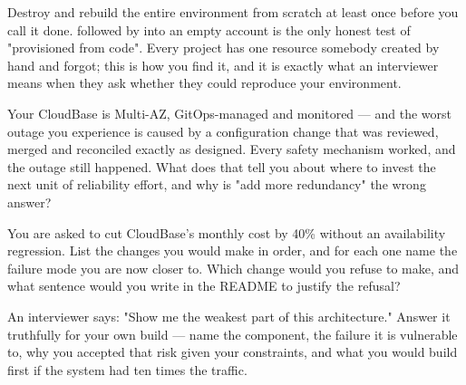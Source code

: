 \begin{prodtip}
Destroy and rebuild the entire environment from scratch at least once before you call it done.  followed by  into an empty account is the only honest test of "provisioned from code". Every project has one resource somebody created by hand and forgot; this is how you find it, and it is exactly what an interviewer means when they ask whether they could reproduce your environment.
\end{prodtip}


\begin{thinkbox}
Your CloudBase is Multi-AZ, GitOps-managed and monitored --- and the worst outage you experience is caused by a configuration change that was reviewed, merged and reconciled exactly as designed. Every safety mechanism worked, and the outage still happened. What does that tell you about where to invest the next unit of reliability effort, and why is "add more redundancy" the wrong answer?
\end{thinkbox}

\begin{thinkbox}
You are asked to cut CloudBase's monthly cost by 40\% without an availability regression. List the changes you would make in order, and for each one name the failure mode you are now closer to. Which change would you refuse to make, and what sentence would you write in the README to justify the refusal?
\end{thinkbox}

\begin{thinkbox}
An interviewer says: "Show me the weakest part of this architecture." Answer it truthfully for your own build --- name the component, the failure it is vulnerable to, why you accepted that risk given your constraints, and what you would build first if the system had ten times the traffic.
\end{thinkbox}


